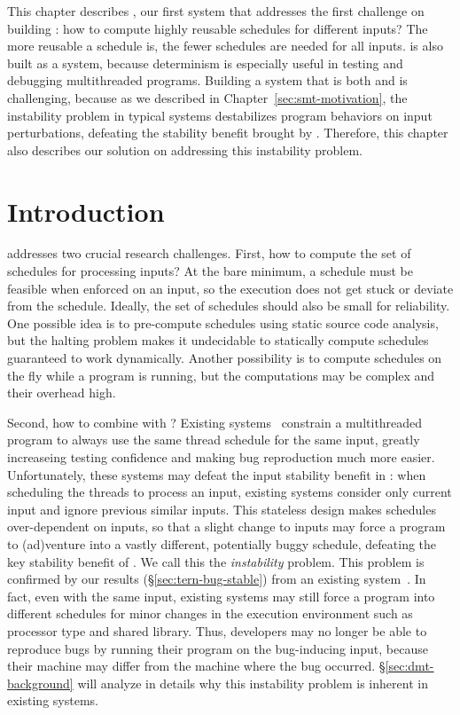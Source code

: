This chapter describes \tern, our first \smt system that
addresses the first challenge on building \smt: how to compute highly reusable
schedules for different inputs? The more reusable a schedule is, the fewer
schedules are needed for all inputs. \tern is also built as a \dmt system,
because determinism is especially useful in testing and debugging multithreaded
programs. Building a system that is both \smt and \dmt is challenging, because
as we described in Chapter~\ref{sec:smt-motivation}, the instability problem in
typical \dmt systems destabilizes program behaviors on input perturbations,
defeating the stability benefit brought by \smt. Therefore, this chapter
also describes our solution on addressing this instability problem.

\section{Introduction} \label{sec:tern-overview}

\tern addresses two crucial research challenges. First, how to compute the set
of schedules for processing inputs?  At the bare minimum, a schedule must be
feasible when enforced on an input, so the execution does not get stuck or
deviate from the schedule.  Ideally, the set of schedules should also be small
for reliability.  One possible idea is to pre-compute schedules using static
source code analysis, but the halting problem makes it undecidable to
statically compute schedules guaranteed to work dynamically.  Another
possibility is to compute schedules on the fly while a program is running,
but the computations may be complex and their overhead high.

Second, how to combine \dmt with \smt? Existing \dmt
systems~\cite{dmp:asplos09,coredet:asplos10,kendo:asplos09} constrain a
multithreaded program to always use the same thread schedule for the same input,
greatly increaseing testing confidence and making bug reproduction much more
easier. Unfortunately, these \dmt systems may defeat the input stability
benefit in \smt: when scheduling the threads to process an
input, existing \dmt systems consider only current input and ignore previous
similar inputs.  This stateless design makes schedules over-dependent on inputs,
so that a slight change to inputs may force a program to (ad)venture into a
vastly different, potentially buggy schedule, defeating the key stability
benefit of \smt.  We call this the \emph{instability} problem. This problem is
confirmed by our results (\S\ref{sec:tern-bug-stable}) from an existing \dmt
system~\cite{coredet:asplos10}. In fact, even with the same input, existing \dmt
systems may still force a program into different schedules for minor changes in
the execution environment such as processor type and shared library.  Thus,
developers may no longer be able to reproduce bugs by running their
program on the bug-inducing input, because their machine may differ from
the machine where the bug occurred. \S\ref{sec:dmt-background} will analyze in
details why this instability problem is inherent in existing \dmt systems.

